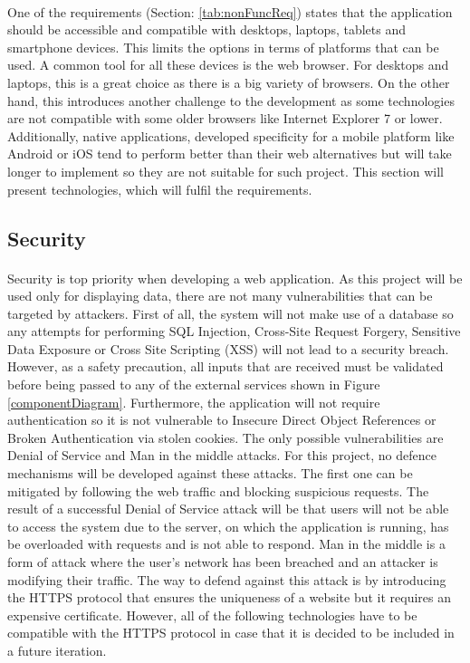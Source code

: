 \documentclass{l4proj}
\begin{document}
\paragraph{}
One of the requirements (Section: \ref{tab:nonFuncReq}) states that the application should be accessible and compatible with desktops, laptops, tablets and smartphone devices. This limits the options in terms of platforms that can be used. A common tool for all these devices is the web browser. For desktops and laptops, this is a great choice as there is a big variety of browsers. On the other hand, this introduces another challenge to the development as some technologies are not compatible with some older browsers like Internet Explorer 7 or lower. Additionally, native applications, developed specificity for a mobile platform like Android or iOS tend to perform better than their web alternatives but will take longer to implement so they are not suitable for such project. This section will present technologies, which will fulfil the requirements.

\subsection{Security}
\paragraph{}
Security is top priority when developing a web application. As this project will be used only for displaying data, there are not many vulnerabilities that can be targeted by attackers. First of all, the system will not make use of a database so any attempts for performing SQL Injection, Cross-Site Request Forgery, Sensitive Data Exposure or Cross Site Scripting (XSS) will not lead to a security breach. However, as a safety precaution, all inputs that are received must be validated before being passed to any of the external services shown in Figure \ref{componentDiagram}. Furthermore, the application will not require authentication so it is not vulnerable to Insecure Direct Object References or Broken Authentication via stolen cookies. The only possible vulnerabilities are Denial of Service and Man in the middle attacks. For this project, no defence mechanisms will be developed against these attacks. The first one can be mitigated by following the web traffic and blocking suspicious requests. The result of a successful Denial of Service attack will be that users will not be able to access the system due to the server, on which the application is running, has be overloaded with requests and is not able to respond. Man in the middle is a form of attack where the user's network has been breached and an attacker is modifying their traffic. The way to defend against this attack is by introducing the HTTPS protocol that ensures the uniqueness of a website but it requires an expensive certificate. However, all of the following technologies have to be compatible with the HTTPS protocol in case that it is decided to be included in a future iteration.   
\end{document}

